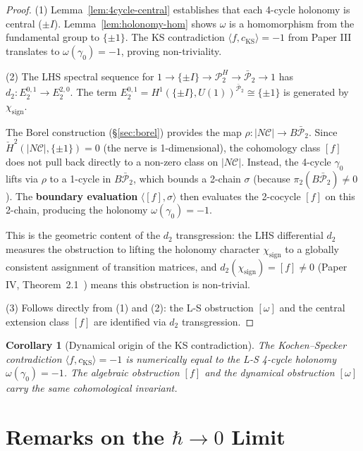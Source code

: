 \documentclass[11pt]{article}
\newtheorem{corollary}[theorem]{Corollary}
\begin{document}
\begin{proof}
(1) Lemma~\ref{lem:4cycle-central} establishes that each 4-cycle holonomy is central
($\pm I$). Lemma~\ref{lem:holonomy-hom} shows $\omega$ is a homomorphism from the
fundamental group to $\{\pm 1\}$. The KS contradiction $\langle f, c_{\mathrm{KS}}
\rangle = -1$ from Paper III~\cite{PaperIII} translates to $\omega(\gamma_0) = -1$,
proving non-triviality.

(2) The LHS spectral sequence for $1 \to \{\pm I\} \to \mathcal{P}_2^H
\to \bar{\mathcal{P}}_2 \to 1$ has $d_2: E_2^{0,1} \to E_2^{2,0}$. The term
$E_2^{0,1} = H^1(\{\pm I\}, U(1))^{\bar{\mathcal{P}}_2} \cong \{\pm 1\}$ is
generated by $\chi_{\text{sign}}$.

The Borel construction (\S\ref{sec:borel}) provides the map
$\rho: |N\mathcal{C}| \to B\bar{\mathcal{P}}_2$. Since
$\check{H}^2(|N\mathcal{C}|, \{\pm 1\}) = 0$ (the nerve is 1-dimensional),
the cohomology class $[f]$ does not pull back directly to a non-zero
class on $|N\mathcal{C}|$. Instead, the 4-cycle $\gamma_0$ lifts via
$\rho$ to a 1-cycle in $B\bar{\mathcal{P}}_2$, which bounds a 2-chain
$\sigma$ (because $\pi_2(B\bar{\mathcal{P}}_2) \neq 0$). The \textbf{boundary
evaluation} $\langle [f], \sigma \rangle$ then evaluates the 2-cocycle
$[f]$ on this 2-chain, producing the holonomy $\omega(\gamma_0) = -1$.

This is the geometric content of the $d_2$ transgression: the LHS
differential $d_2$ measures the obstruction to lifting the holonomy character
$\chi_{\text{sign}}$ to a globally consistent assignment of transition
matrices, and $d_2(\chi_{\text{sign}}) = [f] \neq 0$ (Paper IV,
Theorem~2.1~\cite{PaperIV}) means this obstruction is non-trivial.

(3) Follows directly from (1) and (2): the L-S obstruction $[\omega]$ and the
central extension class $[f]$ are identified via $d_2$ transgression.
\end{proof}

\begin{corollary}[Dynamical origin of the KS contradiction]
\label{cor:ks-dynamical}
The Kochen--Specker contradiction $\langle f, c_{\mathrm{KS}} \rangle = -1$ is
numerically equal to the L-S 4-cycle holonomy $\omega(\gamma_0) = -1$. The
algebraic obstruction $[f]$ and the dynamical obstruction $[\omega]$ carry the
same cohomological invariant.
\end{corollary}

\section{Remarks on the $\hbar \to 0$ Limit}
\label{sec:hbar}
\end{document}
